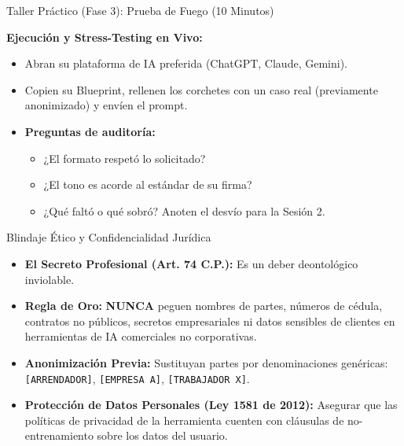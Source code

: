 \documentclass[aspectratio=169]{beamer}
\begin{document}
\begin{frame}{Taller Práctico (Fase 3): Prueba de Fuego (10 Minutos)}

\textbf{Ejecución y Stress-Testing en Vivo:}
\begin{itemize}
  \item Abran su plataforma de IA preferida (ChatGPT, Claude, Gemini).
  \item Copien su Blueprint, rellenen los corchetes con un caso real (previamente anonimizado) y envíen el prompt.
  \item \textbf{Preguntas de auditoría:}
  \begin{itemize}
    \item ¿El formato respetó lo solicitado?
    \item ¿El tono es acorde al estándar de su firma?
    \item ¿Qué faltó o qué sobró? Anoten el desvío para la Sesión 2.
  \end{itemize}
\end{itemize}
\end{frame}

\begin{frame}{Blindaje Ético y Confidencialidad Jurídica}

\begin{itemize}
  \item \textbf{El Secreto Profesional (Art. 74 C.P.):} Es un deber deontológico inviolable.
  \item \textbf{Regla de Oro:} \textbf{NUNCA} peguen nombres de partes, números de cédula, contratos no públicos, secretos empresariales ni datos sensibles de clientes en herramientas de IA comerciales no corporativas.
  \item \textbf{Anonimización Previa:} Sustituyan partes por denominaciones genéricas: \texttt{[ARRENDADOR]}, \texttt{[EMPRESA A]}, \texttt{[TRABAJADOR X]}.
  \item \textbf{Protección de Datos Personales (Ley 1581 de 2012):} Asegurar que las políticas de privacidad de la herramienta cuenten con cláusulas de no-entrenamiento sobre los datos del usuario.
\end{itemize}
\end{frame}
\end{document}
